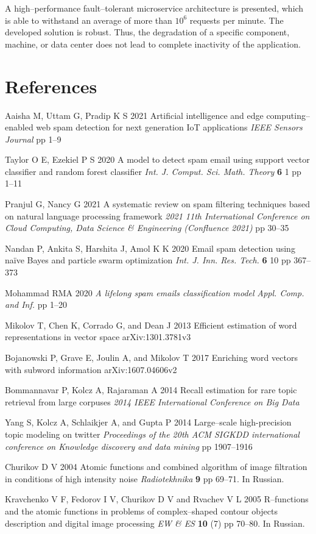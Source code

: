 \documentclass[12pt]{jpconf}
\begin{document}
A high--performance fault--tolerant microservice architecture is presented, which is able to withstand an average of more than $10^6$ requests per minute. The developed solution is robust. Thus, the degradation of a specific component, machine, or data center does not lead to complete inactivity of the application.

\section*{References}
\begin{thebibliography}{99}
Aaisha M, Uttam G, Pradip K S
2021 {Artificial intelligence and edge computing--enabled
	web spam detection for next generation IoT
	applications} {\it IEEE Sensors Journal} {\bf } pp 1--9

Taylor O E, Ezekiel P S
2020 {A model to detect spam email using support vector classifier and random forest classifier} 
\emph{Int. J. Comput. Sci. Math. Theory} {\bf 6} 1 pp 1--11

Pranjul G, Nancy G
2021 {A systematic review on spam filtering techniques based on
natural language processing framework} \emph{2021 11th International Conference on Cloud Computing, Data Science \& Engineering (Confluence 2021)} pp 30--35

Nandan P, Ankita S, Harshita J, Amol K K
2020 {Email spam detection using naïve Bayes and particle swarm optimization} \emph{Int. J. Inn. Res. Tech.} {\bf 6} 10 pp 367--373

Mohammad RMA
2020 \emph{A lifelong spam emails classification model}
\emph{Appl. Comp. and Inf.} pp 1--20

Mikolov T, Chen K, Corrado G, and Dean J
2013 {Efficient estimation of word representations in vector space} 
arXiv:1301.3781v3

Bojanowski P, Grave E, Joulin A, and Mikolov T
2017 {Enriching word vectors with subword information} 
arXiv:1607.04606v2

Bommannavar P, Kolcz A, Rajaraman A
2014 {Recall estimation for rare topic retrieval from large corpuses}
\emph{2014 IEEE International Conference on Big Data}

Yang S, Kolcz A, Schlaikjer A, and Gupta P
2014 {Large--scale high-precision topic modeling on twitter} 
\emph{Proceedings of the 20th ACM SIGKDD international conference on Knowledge discovery and data mining} pp 1907--1916

 Churikov D V 2004
{Atomic functions and combined algorithm of image filtration in conditions of high intensity noise}
\emph{Radiotekhnika} \textbf{9} pp 69--71. In Russian.

Kravchenko V F, Fedorov I V, Churikov D V and Rvachev V L 2005 
{R--functions and the atomic functions in problems of complex--shaped contour objects description and digital image processing}
\emph{EW \& ES} \textbf{10} (7) pp 70--80. In Russian.

\end{thebibliography}
\end{document}

